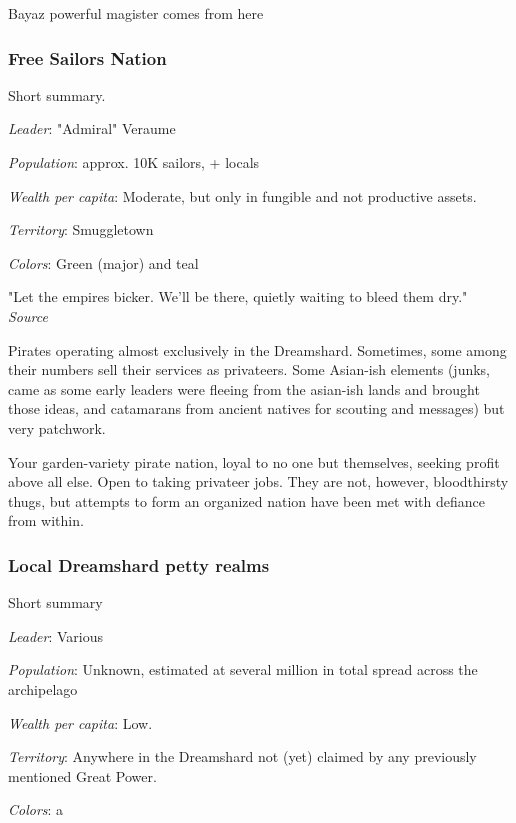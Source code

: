 Bayaz powerful magister comes from here


\subsubsection{Free Sailors Nation}

Short summary.

\textit{Leader}: "Admiral" Veraume

\textit{Population}: approx. 10K sailors, + locals

\textit{Wealth per capita}: Moderate, but only in fungible and not productive assets.

\textit{Territory}: Smuggletown
    
\textit{Colors}: Green (major) and teal

\begin{rpg-quotebox}
    "Let the empires bicker. We'll be there, quietly waiting to bleed them dry." \\ \textendash \textit{Source}
\end{rpg-quotebox}


Pirates operating almost exclusively in the Dreamshard. Sometimes, some among their numbers sell their services as privateers. Some Asian-ish elements (junks, came as some early leaders were fleeing from the asian-ish lands and brought those ideas, and catamarans from ancient natives for scouting and messages) but very patchwork. 
	
Your garden-variety pirate nation, loyal to no one but themselves, seeking profit above all else. Open to taking privateer jobs. They are not, however, bloodthirsty thugs, but attempts to form an organized nation have been met with defiance from within.




\subsubsection{Local Dreamshard petty realms}


Short summary

\textit{Leader}: Various

\textit{Population}: Unknown, estimated at several million in total spread across the archipelago

\textit{Wealth per capita}: Low.

\textit{Territory}: Anywhere in the Dreamshard not (yet) claimed by any previously mentioned Great Power.
    
\textit{Colors}: a

